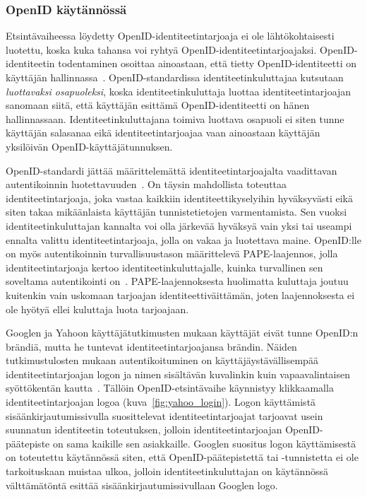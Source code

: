 \documentclass[finnish,gradu]{tktltiki}
\begin{document}
    \subsubsection{OpenID käytännössä} %
    \label{ssub:openid_käytännössä}

    Etsintävaiheessa löydetty OpenID-identiteetintarjoaja ei ole lähtökohtaisesti luotettu, koska kuka tahansa voi ryhtyä OpenID-identi\-teetin\-tarjoajaksi. OpenID-identi\-teetin todentaminen osoittaa ainoastaan, että tietty OpenID-identiteetti on käyttäjän hallinnassa~\cite{openid_2.0_specification_07}. OpenID-standardissa identiteetinkuluttajaa kutsutaan \emph{luottavaksi osapuoleksi}, koska identiteetinkuluttaja luottaa identiteetintarjoajan sanomaan siitä, että käyttäjän esittämä OpenID-identiteetti on hänen hallinnassaan. Identiteetinkuluttajana toimiva luottava osapuoli ei siten tunne käyttäjän salasanaa eikä identiteetintarjoajaa vaan ainoastaan käyttäjän yksilöivän OpenID-käyttäjätunnuksen.

    OpenID-standardi jättää määrittelemättä identiteetintarjoajalta vaadittavan autentikoinnin luotettavuuden~\cite{openid_2.0_specification_07}. On täysin mahdollista toteuttaa identiteetintarjoaja, joka vastaa kaikkiin identiteettikyselyihin hyväksyvästi eikä siten takaa mikäänlaista käyttäjän tunnistetietojen varmentamista. Sen vuoksi identiteetinkuluttajan kannalta voi olla järkevää hyväksyä vain yksi tai useampi ennalta valittu identiteetintarjoaja, jolla on vakaa ja luotettava maine. OpenID:lle on myös autentikoinnin turvallisuustason määrittelevä PAPE-laajennos, jolla identiteetintarjoaja kertoo identiteetinkuluttajalle, kuinka turvallinen sen soveltama autentikointi on~\cite{openid_2.0_pape_07}. PAPE-laajennoksesta huolimatta kuluttaja joutuu kuitenkin vain uskomaan tarjoajan identiteettiväittämän, joten laajennoksesta ei ole hyötyä ellei kuluttaja luota tarjoajaan.

    Googlen ja Yahoon käyttäjätutkimusten mukaan käyttäjät eivät tunne OpenID:n brändiä, mutta he tuntevat identiteetintarjoajansa brändin. Näiden tutkimustulosten mukaan autentikoituminen on käyttäjäystävällisempää identiteetintarjoajan logon ja nimen sisältävän kuvalinkin kuin vapaavalintaisen syöttökentän kautta~\cite{google_usability_federated_login_2008, yahoo_usability_openid_2008, google_thoughts_combining_ux_2008}. Tällöin OpenID-etsintävaihe käynnistyy klikkaamalla identiteetintarjoajan logoa (kuva~\ref{fig:yahoo_login}). Logon käyttämistä sisäänkirjautumissivulla suosittelevat identiteetintarjoajat tarjoavat usein suunnatun identiteetin toteutuksen, jolloin identiteetintarjoajan OpenID-päätepiste on sama kaikille sen asiakkaille. Googlen suositus logon käyttämisestä on toteutettu käytännössä siten, että OpenID-päätepistettä tai -tunnistetta ei ole tarkoituskaan muistaa ulkoa, jolloin identiteetinkuluttajan on käytännössä välttämätöntä esittää sisäänkirjautumissivullaan Googlen logo.
\end{document}
